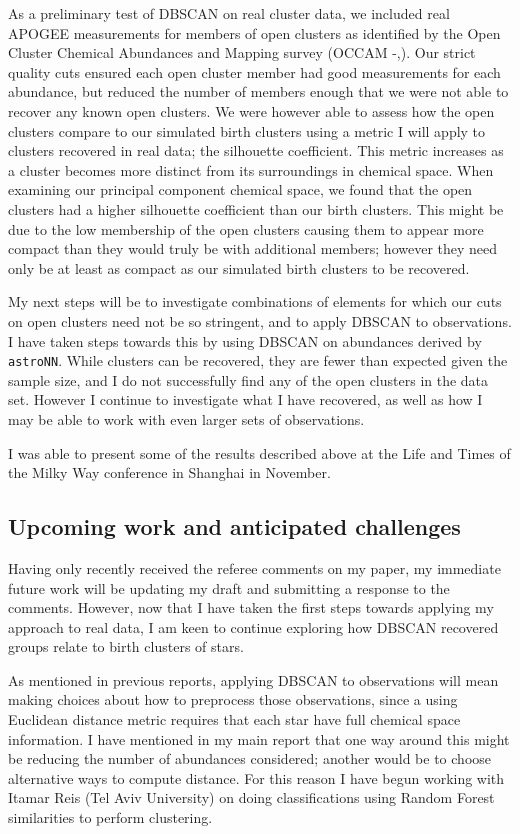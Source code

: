 \documentclass[11pt]{article}
\begin{document}
	As a preliminary test of DBSCAN on real cluster data, we included real APOGEE measurements for members of open clusters as identified by the Open Cluster Chemical Abundances and Mapping survey (OCCAM -\citealt{Frinchaboy2003},\citealt{Donor2018}). Our strict quality cuts ensured each open cluster member had good measurements for each abundance, but reduced the number of members enough that we were not able to recover any known open clusters. We were however able to assess how the open clusters compare to our simulated birth clusters using a metric I will apply to clusters recovered in real data; the silhouette coefficient. This metric increases as a cluster becomes more distinct from its surroundings in chemical space. When examining our principal component chemical space, we found that the open clusters had a higher silhouette coefficient than our birth clusters. This might be due to the low membership of the open clusters causing them to appear more compact than they would truly be with additional members; however they need only be at least as compact as our simulated birth clusters to be recovered.
	
	My next steps will be to investigate combinations of elements for which our cuts on open clusters need not be so stringent, and to apply DBSCAN to observations. I have taken steps towards this by using DBSCAN on abundances derived by \texttt{astroNN}. While clusters can be recovered, they are fewer than expected given the sample size, and I do not successfully find any of the open clusters in the data set. However I continue to investigate what I have recovered, as well as how I may be able to work with even larger sets of observations.
	
	I was able to present some of the results described above at the Life and Times of the Milky Way conference in Shanghai in November.
    
    \subsection*{Upcoming work and anticipated challenges}
    
    Having only recently received the referee comments on my paper, my immediate future work will be updating my draft and submitting a response to the comments. However, now that I have taken the first steps towards applying my approach to real data, I am keen to continue exploring how DBSCAN recovered groups relate to birth clusters of stars. 
    
    As mentioned in previous reports, applying DBSCAN to observations will mean making choices about how to preprocess those observations, since a using Euclidean distance metric requires that each star have full chemical space information. I have mentioned in my main report that one way around this might be reducing the number of abundances considered; another would be to choose alternative ways to compute distance. For this reason I have begun working with Itamar Reis (Tel Aviv University) on doing classifications using Random Forest similarities \citep{Reis2018} to perform clustering.
    
\end{document}
